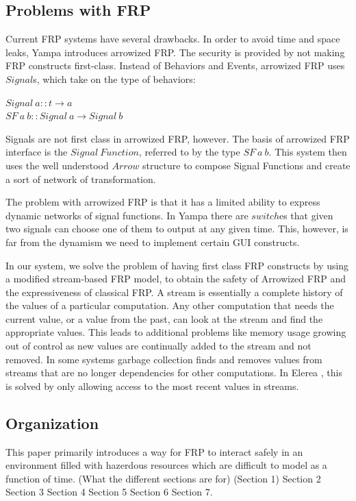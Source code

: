 \documentclass[twocolumn,11pt,english]{article}
\begin{document}
\subsection{Problems with FRP}
  Current FRP systems have several drawbacks. In order to avoid time and space leaks, Yampa \cite{hudak2003arrows} introduces arrowized FRP. The security is provided by not making FRP constructs first-class. Instead of Behaviors and Events, arrowized FRP uses $Signal$s, which take on the type of behaviors:
\begin{center}
  $Signal~a:: t \rightarrow a$
\\$SF~a~b:: Signal~a \rightarrow Signal~b$
\end{center}

Signals are not first class in arrowized FRP, however. The basis of arrowized FRP interface is the $Signal~Function$, referred to by the type $SF~a~b$. This system then uses the well understood $Arrow$ structure to compose Signal Functions and create a sort of network of transformation. 

The problem with arrowized FRP is that it has a limited ability to express dynamic networks of signal functions. In Yampa there are $switch$es that given two signals can choose one of them to output at any given time. This, however, is far from the dynamism we need to implement certain GUI constructs. 

 In our system, we solve the problem of having first class FRP constructs by using a modified stream-based FRP model\cite{HighOrderStreams}, to obtain the safety of Arrowized FRP and the expressiveness of classical FRP. A stream is essentially a complete history of the values of a particular computation. Any other computation that needs the current value, or a value from the past, can look at the stream and find the appropriate values. This leads to additional problems like memory usage growing out of control as new values are continually added to the stream and not removed. In some systems garbage collection finds and removes values from streams that are no longer dependencies for other computations. In Elerea \cite{HighOrderStreams}, this is solved by only allowing access to the most recent values in streams. 


\subsection{Organization}
This paper primarily introduces a way for FRP to interact safely in an environment filled with hazerdous resources which are difficult to model as a function of time. (What the different sections are for) (Section 1) Section 2 Section 3 Section 4 Section 5 Section 6 Section 7.
\end{document}
